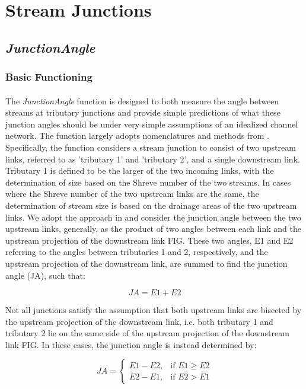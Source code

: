 \section{Stream Junctions}
\subsection{\textit{JunctionAngle}} \label{sec:JAngle}
\subsubsection{Basic Functioning}
\paragraph{}The \textit{JunctionAngle} function is designed to both measure the angle between streams at tributary junctions and provide simple predictions of what these junction angles should be under very simple assumptions of an idealized channel network. The function largely adopts nomenclatures and methods from \cite{Howard1971}. Specifically, the function considers a stream junction to consist of two upstream links, referred to as 'tributary 1' and 'tributary 2', and a single downstream link. Tributary 1 is defined to be the larger of the two incoming links, with the determination of size based on the Shreve number of the two streams. In cases where the Shreve number of the two upstream links are the same, the determination of stream size is based on the drainage areas of the two upstream links. We adopt the approach in \cite{Howard1971} and consider the junction angle between the two upstream links, generally, as the product of two angles between each link and the upstream projection of the downstream link FIG. These two angles, E1 and E2 referring to the angles between tributaries 1 and 2, respectively, and the upstream projection of the downstream link, are summed to find the junction angle (JA), such that:

\begin{equation}
JA = E1 + E2
\end{equation}

\noindent Not all junctions satisfy the assumption that both upstream links are bisected by the upstream projection of the downstream link, i.e. both tributary 1 and tributary 2 lie on the same side of the upstream projection of the downstream link FIG. In these cases, the junction angle is instead determined by:

\begin{equation}
JA =
\begin{cases}
E1 - E2,& \text{if } E1\geq E2\\
E2 - E1,& \text{if } E2> E1
\end{cases}
\end{equation}

